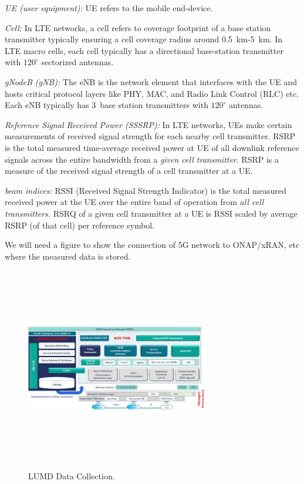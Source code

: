 \documentclass[conference, 10pt]{IEEEtran}
\begin{document}
{\em UE (user equipment):} UE refers to the mobile end-device.

{\em Cell:} In LTE networks, a cell refers to coverage footprint of a base station
transmitter typically ensuring a cell coverage radius around 0.5~km-5~km.  In LTE
macro cells, each cell typically has a directional base-station transmitter with
$120^\circ$ sectorized antennas.

{\em gNodeB (gNB):} The eNB is the network element that interfaces with the UE and
hosts critical protocol layers like PHY, MAC, and Radio Link Control (RLC) etc. Each
eNB typically has 3~base station transmitters with $120^\circ$ antennas.

{\em Reference Signal Received Power (SSSRP):} In LTE networks, UEs make certain
measurements of received signal strength for each nearby cell transmitter. RSRP is
the total measured time-average received power at UE of all downlink reference
signals across the entire bandwidth from a {\em given cell transmitter}. RSRP is a
measure of the received signal strength of a cell transmitter at a UE.

{\em beam indices:} RSSI (Received Signal Strength Indicator) is the total measured
received power at the UE over the entire band of operation from {\em all cell
transmitters.} RSRQ of a given cell transmitter at a UE is RSSI scaled by average
RSRP (of that cell) per reference symbol.

We will need a figure to show the connection of 5G network to ONAP/xRAN, etc where the measured 
data is stored.

\begin{figure}[t]
\begin{center}
\includegraphics[height=3.5in,width=3.2in]{./ONAP-architecture.png}
\caption{\label{fig:lumd_arch}
{\small LUMD Data Collection.}}
\end{center}
\end{figure}
\end{document}
